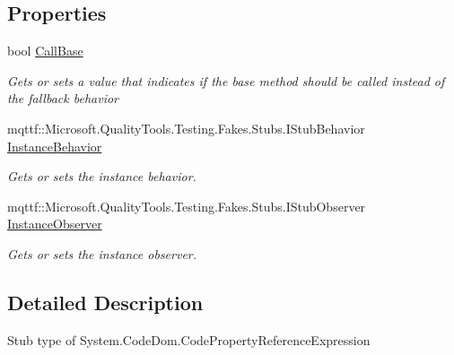 \subsection*{Properties}
\begin{DoxyCompactItemize}
\item 
bool \hyperlink{class_system_1_1_code_dom_1_1_fakes_1_1_stub_code_property_reference_expression_a535a97dd805392b7bf6e6e10b6b6ef75}{Call\-Base}
\begin{DoxyCompactList}\small\item\em Gets or sets a value that indicates if the base method should be called instead of the fallback behavior\end{DoxyCompactList}\item 
mqttf\-::\-Microsoft.\-Quality\-Tools.\-Testing.\-Fakes.\-Stubs.\-I\-Stub\-Behavior \hyperlink{class_system_1_1_code_dom_1_1_fakes_1_1_stub_code_property_reference_expression_a0863b69d4639a83e61cdc262984de78e}{Instance\-Behavior}
\begin{DoxyCompactList}\small\item\em Gets or sets the instance behavior.\end{DoxyCompactList}\item 
mqttf\-::\-Microsoft.\-Quality\-Tools.\-Testing.\-Fakes.\-Stubs.\-I\-Stub\-Observer \hyperlink{class_system_1_1_code_dom_1_1_fakes_1_1_stub_code_property_reference_expression_a9a86149f524ad68908bb1a3dff5a2dfa}{Instance\-Observer}
\begin{DoxyCompactList}\small\item\em Gets or sets the instance observer.\end{DoxyCompactList}\end{DoxyCompactItemize}


\subsection{Detailed Description}
Stub type of System.\-Code\-Dom.\-Code\-Property\-Reference\-Expression



